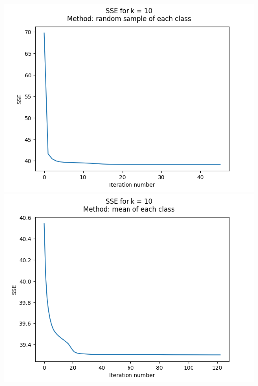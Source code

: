 \documentclass{article}
\begin{document}
\begin{center}
    \includegraphics[trim=0 0 3cm 0, scale=0.5]{images/task1_8_3.png}
    \vspace{0.5cm}
    \includegraphics[scale=0.5]{images/task1_8_4.png}
\end{center}

\end{document}
